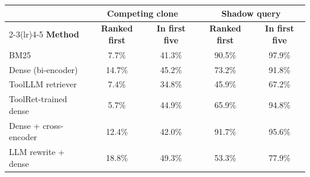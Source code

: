 \begin{tabular}{lcccc}
\toprule
 & \multicolumn{2}{c}{\textbf{Competing clone}} & \multicolumn{2}{c}{\textbf{Shadow query}} \\
\cmidrule(lr){2-3}\cmidrule(lr){4-5}
\textbf{Method} & \textbf{Ranked first} & \textbf{In first five} & \textbf{Ranked first} & \textbf{In first five} \\
\midrule
BM25 & 7.7\% & 41.3\% & 90.5\% & 97.9\% \\
Dense (bi-encoder) & 14.7\% & 45.2\% & 73.2\% & 91.8\% \\
ToolLLM retriever & 7.4\% & 34.8\% & 45.9\% & 67.2\% \\
ToolRet-trained dense & 5.7\% & 44.9\% & 65.9\% & 94.8\% \\
Dense + cross-encoder & 12.4\% & 42.0\% & 91.7\% & 95.6\% \\
LLM rewrite + dense & 18.8\% & 49.3\% & 53.3\% & 77.9\% \\
\bottomrule
\end{tabular}
